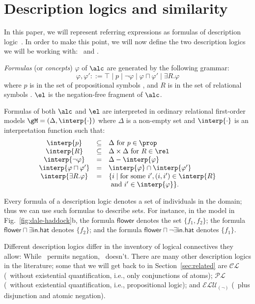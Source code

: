 \section{Description logics and similarity}
\label{sec:bisim}

In this paper, we will represent referring expressions as formulas of
description logic~\cite{baad:desc03}.  In order to make this point, we
will now define the two description logics we will be working with:
\alc\ and \el.

\emph{Formulas} (or \emph{concepts}) $\varphi$ of $\alc$ are generated
by the following grammar:
$$
\varphi,\varphi' ::= \top \mid p \mid \neg \varphi \mid \varphi \sqcap \varphi'
\mid \exists R. \varphi
$$
where $p$ is in the set of propositional symbols \prop, and $R$ is in
the set of relational symbols \rel. $\el$ is the negation-free
fragment of $\alc$.

Formulas of both $\alc$ and $\el$ are interpreted in ordinary
relational first-order models $\gM = (\Delta,\interp{\cdot})$ where
$\Delta$ is a non-empty set and $\interp{\cdot}$ is an
interpretation function such that:
$$
\begin{array}{ccl}
\interp{p} & \subseteq & \Delta  \mbox{ for $p \in \prop$}\\
\interp{R} & \subseteq & \Delta \times \Delta  \mbox{ for $R \in \rel$}\\
\interp{\neg \varphi} & = & \Delta - \interp{\varphi}\\
\interp{\varphi \sqcap \varphi'} & = & \interp{\varphi} \cap \interp{\varphi'}\\
\interp{\exists R.\varphi} & = & \{i \mid \mbox{for some } i', (i,i') \in \interp{R}\\
& & \mbox{ and } i' \in \interp{\varphi} \}.\\
\end{array}
$$


Every formula of a description logic denotes a set of individuals in
the domain; thus we can use such formulas to describe sets.  For
instance, in the model in Fig.~\ref{fig:dale-haddock}b, the formula
$\mathsf{flower}$ denotes the set $\{f_1,f_2\}$; the formula
$\mathsf{flower} \sqcap \exists \mathsf{in}.\mathsf{hat}$ denotes
$\{f_2\}$; and the formula $\mathsf{flower} \sqcap \neg
\exists \mathsf{in}.\mathsf{hat}$ denotes $\{f_1\}$.

Different description logics differ in the inventory of logical
connectives they allow: While \alc\ permits negation, \el\
doesn't. There are many other description logics in the literature;
some that we will get back to in Section~\ref{sec:related} are
$\mathcal{CL}$ (\el\ without existential quantification, i.e., only
conjunctions of atoms); $\mathcal{PL}$ (\alc\ without existential
quantification, i.e., propositional logic); and
$\mathcal{ELU}_{(\neg)}$ (\el\ plus disjunction and atomic negation).


